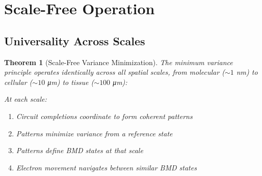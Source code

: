 \documentclass[12pt,a4paper]{article}
\newtheorem{theorem}{Theorem}
\begin{document}
\section{Scale-Free Operation}

\subsection{Universality Across Scales}

\begin{theorem}[Scale-Free Variance Minimization]
\label{thm:scale_free}
The minimum variance principle operates identically across all spatial scales, from molecular ($\sim 1$ nm) to cellular ($\sim 10$ μm) to tissue ($\sim 100$ μm):

At each scale:
\begin{enumerate}
\item Circuit completions coordinate to form coherent patterns
\item Patterns minimize variance from a reference state
\item Patterns define BMD states at that scale
\item Electron movement navigates between similar BMD states
\end{enumerate}
\end{theorem}
\end{document}
